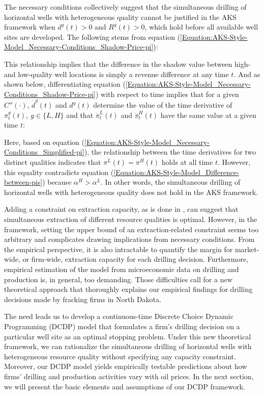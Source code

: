 The necessary conditions collectively suggest that the simultaneous drilling of horizontal wells with heterogeneous quality cannot be justified in the AKS framework when $d^{g}(t) > 0$ and $R^{g}(t) > 0$, which hold before all available well sites are developed.
The following stems from equation (\ref{Equation:AKS-Style-Model_Necessary-Conditions_Shadow-Price-pi}):

This relationship implies that the difference in the shadow value between high- and low-quality well locations is simply a revenue difference at any time $t$. And as shown below, differentiating equation (\ref{Equation:AKS-Style-Model_Necessary-Conditions_Shadow-Price-pi}) with respect to time implies that for a given $C'' (\cdot)$, $\dot{d}^{g} (t)$ and $d^{g} (t)$ determine the value of the time derivative of $\pi_{t}^{g} (t), \ g \in \{L, H\}$ and that $\dot{\pi}_{t}^{L} (t)$ and $\dot{\pi}_{t}^{H} (t)$ have the same value at a given time $t$:

Here, based on equation (\ref{Equation:AKS-Style-Model_Necessary-Conditions_Simplified-pi}), the relationship between the time derivatives for two distinct qualities indicates that $\pi^{L} (t) = \pi^{H} (t)$ holds at all time $t$. However, this equality contradicts equation (\ref{Equation:AKS-Style-Model_Difference-between-pis}) because $\alpha^{H} > \alpha^{L}$. In other words, the simultaneous drilling of horizontal wells with heterogeneous quality does not hold in the AKS framework. 

Adding a constraint on extraction capacity, as is done in \cite{Extraction-Capacity-and-the-Optimal-Order-of-Extraction_Holland_2003}, can suggest that simultaneous extraction of different resource qualities is optimal. However, in the framework, setting the upper bound of an extraction-related constraint seems too arbitrary and complicates drawing implications from necessary conditions. From the empirical perspective, it is also intractable to quantify the margin for market-wide, or firm-wide, extraction capacity for each drilling decision. Furthermore, empirical estimation of the model from microeconomic data on drilling and production is, in general, too demanding. Those difficulties call for a new theoretical approach that thoroughly explains our empirical findings for drilling decisions made by fracking firms in North Dakota. 

The need leads us to develop a continuous-time Discrete Choice Dynamic Programming (DCDP) model that formulates a firm's drilling decision on a particular well site as an optimal stopping problem. Under this new theoretical framework, we can rationalize the simultaneous drilling of horizontal wells with heterogeneous resource quality without specifying any capacity constraint. Moreover, our DCDP model yields empirically testable predictions about how firms' drilling and production activities vary with oil prices. In the next section, we will present the basic elements and assumptions of our DCDP framework. 
